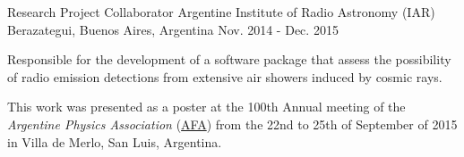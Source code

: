 \begin{cventries}
  \cventry
    {Research Project Collaborator} %
    {Argentine Institute of Radio Astronomy (IAR) \href{https://mattborghi.github.io/projects/ALAMBRE/}{\faGithub}} %
    {Berazategui, Buenos Aires, Argentina} %
    {Nov. 2014 - Dec. 2015} %
    {
      \begin{cvitems} %
           \item {Responsible for the development of a software package that assess the possibility of radio emission detections from extensive air showers induced by cosmic rays.}
          \item {This work was presented as a poster at the 100th Annual meeting of the \emph{Argentine Physics Association} (\href{https://www.fisica.org.ar/}{AFA}) from the 22nd to 25th of September of 2015 in Villa de Merlo, San Luis, Argentina.}
      \end{cvitems}
    }
 
\end{cventries}
